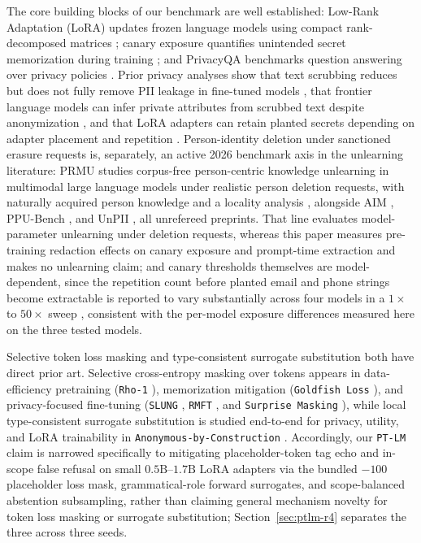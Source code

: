 \documentclass{article}
\begin{document}
The core building blocks of our benchmark are well established: Low-Rank Adaptation (LoRA) updates frozen language models using compact rank-decomposed matrices \citep{hu_lora}; canary exposure quantifies unintended secret memorization during training \citep{carlini_secret_sharer}; and PrivacyQA benchmarks question answering over privacy policies \citep{ravichander_privacyqa}. Prior privacy analyses show that text scrubbing reduces but does not fully remove PII leakage in fine-tuned models \citep{lukas_pii_leakage}, that frontier language models can infer private attributes from scrubbed text despite anonymization \citep{staab2024beyond}, and that LoRA adapters can retain planted secrets depending on adapter placement and repetition \citep{tan_lora_memorization}. Person-identity deletion under sanctioned erasure requests is, separately, an active 2026 benchmark axis in the unlearning literature: PRMU studies corpus-free person-centric knowledge unlearning in multimodal large language models under realistic person deletion requests, with naturally acquired person knowledge and a locality analysis \citep{prmu2026person}, alongside AIM \citep{aim2026person}, PPU-Bench \citep{ppubench2026}, and UnPII \citep{unpii2026}, all unrefereed preprints. That line evaluates model-parameter unlearning under deletion requests, whereas this paper measures pre-training redaction effects on canary exposure and prompt-time extraction and makes no unlearning claim; and canary thresholds themselves are model-dependent, since the repetition count before planted email and phone strings become extractable is reported to vary substantially across four models in a $1\times$ to $50\times$ sweep \citep{fcpa2026cana}, consistent with the per-model exposure differences measured here on the three tested models.

Selective token loss masking and type-consistent surrogate substitution both have direct prior art. Selective cross-entropy masking over tokens appears in data-efficiency pretraining (\texttt{Rho-1} \citep{lin2024rho1}), memorization mitigation (\texttt{Goldfish Loss} \citep{hans2024goldfish}), and privacy-focused fine-tuning (\texttt{SLUNG} \citep{wang2025slung}, \texttt{RMFT} \citep{joshi2025rmft}, and \texttt{Surprise Masking} \citep{tyagi2026surprise}), while local type-consistent surrogate substitution is studied end-to-end for privacy, utility, and LoRA trainability in \texttt{Anonymous-by-Construction} \citep{albanese2026anonymous}. Accordingly, our \texttt{PT-LM} claim is narrowed specifically to mitigating placeholder-token tag echo and in-scope false refusal on small $0.5\text{B}$--$1.7\text{B}$ LoRA adapters via the bundled $-100$ placeholder loss mask, grammatical-role forward surrogates, and scope-balanced abstention subsampling, rather than claiming general mechanism novelty for token loss masking or surrogate substitution; Section~\ref{sec:ptlm-r4} separates the three across three seeds.
\end{document}
